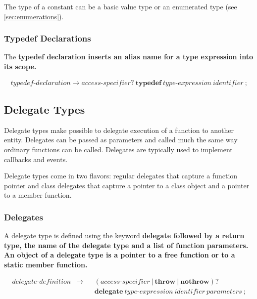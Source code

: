 \documentclass[a4paper,oneside,11pt]{article}
\begin{document}
The type of a constant can be a basic value type or an enumerated type (see \ref{sec:enumerations}).

\subsubsection{Typedef Declarations}\label{typedefdeclaration}

The \bf{typedef} declaration inserts an alias name for a type expression into its scope.

\begin{align*}
typedef\textrm{-}declaration \rightarrow \hyperref[accessspecifier]{access\textrm{-}specifier}? \> \textbf{typedef} \>
\hyperref[typeexpr]{type\textrm{-}expression} \> \hyperref[identifier]{identifier} \> \texttt{;}
\end{align*}

\subsection{Delegate Types}

Delegate types make possible to delegate execution of a function to another entity.
Delegates can be passed as parameters and called much the same way ordinary functions can be called.
Delegates are typically used to implement callbacks and events.

Delegate types come in two flavors: regular delegates that capture a function pointer and
class delegates that capture a pointer to a class object and a pointer to a member function.

\subsubsection{Delegates}\label{delegatedefinition}

A delegate type is defined using the keyword \bf{delegate} followed by a return type, the name of the delegate type and a
list of function parameters.
An object of a delegate type is a pointer to a free function or to a static member function.

\begin{align*}
delegate\textrm{-}definition &\rightarrow & &(\hyperref[accessspecifier]{access\textrm{-}specifier} \> | \> \textbf{throw} \> | \> \textbf{nothrow})?\\
& & &\textbf{delegate} \> \hyperref[typeexpr]{type\textrm{-}expression} \> \hyperref[identifier]{identifier} \> \hyperref[parameters]{parameters} \> \texttt{;}
\end{align*}
\end{document}
